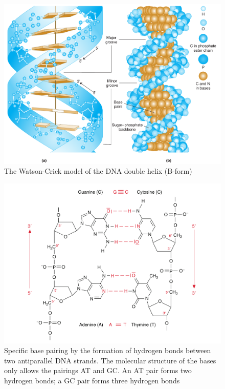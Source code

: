 \documentclass[11pt,ignorenonframetext,aspectratio=169]{beamer}
\begin{document}
\begin{frame}{}
\protect\hypertarget{section-1}{}

\begin{figure}
\includegraphics[width=0.65\linewidth]{../images/double_helix_dna} \caption{The Watson-Crick model of the DNA double helix (B-form)}\label{fig:double-helix}
\end{figure}

\end{frame}

\begin{frame}{}
\protect\hypertarget{section-2}{}

\begin{figure}
\includegraphics[width=0.65\linewidth]{../images/complementary_base_pairing} \caption{Specific base pairing by the formation of hydrogen bonds between two antiparallel DNA strands. The molecular structure of the bases only allows the pairings AT and GC. An AT pair forms two hydrogen bonds; a GC pair forms three hydrogen bonds}\label{fig:base-pairing}
\end{figure}

\end{frame}
\end{document}
